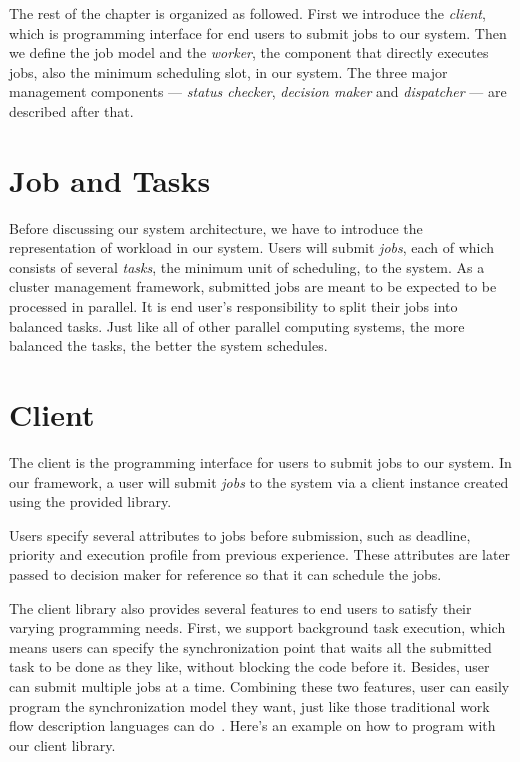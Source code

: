 The rest of the chapter is organized as followed.  
First we introduce the \emph{client}, which is programming interface for
end users to submit jobs to our system.
Then we define the job model and the \emph{worker}, the component that
directly executes jobs, also the minimum scheduling slot, in our system.
The three major management components --- \emph{status checker},
\emph{decision maker} and \emph{dispatcher} --- are described after
that.

\section{Job and Tasks}

Before discussing our system architecture, we have to introduce the
representation of workload in our system.
Users will submit \emph{jobs}, each of which consists of several
\emph{tasks}, the minimum unit of scheduling, to the system.
As a cluster management framework, submitted jobs are meant to be
expected to be processed in parallel.
It is end user's responsibility to split their jobs into balanced tasks.
Just like all of other parallel computing systems, the more balanced the
tasks, the better the system schedules.

\section{Client}

The client is the programming interface for users to submit jobs to our
system.
In our framework, a user will submit \emph{jobs} to the system via a
client instance created using the provided library.

Users specify several attributes to jobs before submission, such as
deadline, priority and execution profile from previous experience.
These attributes are later passed to decision maker for reference so
that it can schedule the jobs.

The client library also provides several features to end users to
satisfy their varying programming needs.
First, we support background task execution, which means users can
specify the synchronization point that waits all the submitted task to
be done as they like, without blocking the code before it.
Besides, user can submit multiple jobs at a time.
Combining these two features, user can easily program the
synchronization model they want, just like those traditional work flow
description languages can do~\cite{cite:workflow-management}.
Here's an example on how to program with our client library.


